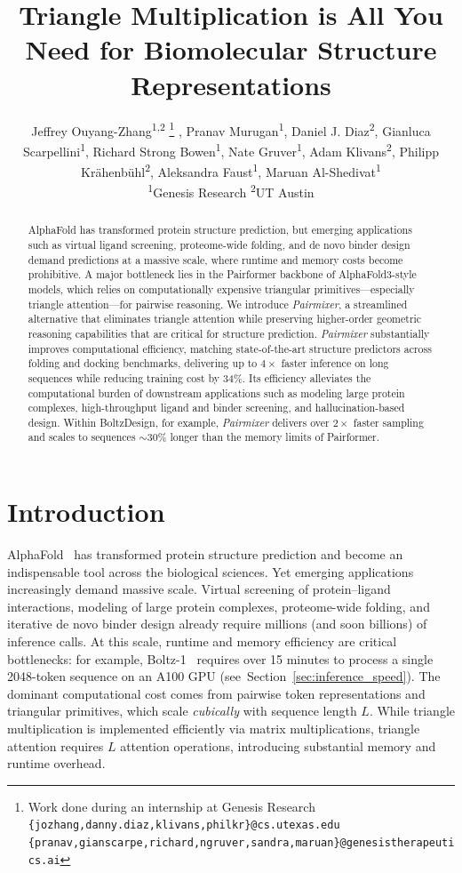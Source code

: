\documentclass{article} %
\title{Triangle Multiplication is All You Need for Biomolecular Structure Representations}
\author{
\hspace{-0.5em} Jeffrey Ouyang-Zhang\textsuperscript{1,2}
\thanks{Work done during an internship at Genesis Research \\ 
\texttt{\{jozhang,danny.diaz,klivans,philkr\}@cs.utexas.edu} \\
\texttt{\{pranav,gianscarpe,richard,ngruver,sandra,maruan\}@genesistherapeutics.ai}}
, Pranav Murugan\textsuperscript{1}, Daniel J. Diaz\textsuperscript{2}, Gianluca Scarpellini\textsuperscript{1},
\AND Richard Strong Bowen\textsuperscript{1}, Nate Gruver\textsuperscript{1},
Adam Klivans\textsuperscript{2}, Philipp Kr\"ahenb\"uhl\textsuperscript{2},
\AND Aleksandra Faust\textsuperscript{1}, Maruan Al-Shedivat\textsuperscript{1} \\
\textsuperscript{1}Genesis Research \quad \textsuperscript{2}UT Austin \\
}
\newcommand{\refsec}[1]{Section~\ref{sec:#1}}
\def\name{{\textit{Pairmixer}}\xspace}
\begin{document}
\maketitle

\begin{abstract}
AlphaFold has transformed protein structure prediction, but emerging applications such as virtual ligand screening, proteome-wide folding, and de novo binder design demand predictions at a massive scale, where runtime and memory costs become prohibitive.
A major bottleneck lies in the Pairformer backbone of AlphaFold3-style models, which relies on computationally expensive triangular primitives—especially triangle attention—for pairwise reasoning.
We introduce \name, a streamlined alternative that eliminates triangle attention while preserving higher-order geometric reasoning capabilities that are critical for structure prediction.
\name substantially improves computational efficiency, matching state-of-the-art structure predictors across folding and docking benchmarks, delivering up to $4\times$ faster inference on long sequences while reducing training cost by 34\%.
Its efficiency alleviates the computational burden of downstream applications such as modeling large protein complexes, high-throughput ligand and binder screening, and hallucination-based design.
Within BoltzDesign, for example, \name delivers over $2\times$ faster sampling and scales to sequences $\sim$30\% longer than the memory limits of Pairformer. 








\end{abstract}

\section{Introduction}

AlphaFold~\citep{senior2020improved,jumper2021alphafold2} has transformed protein structure prediction and become an indispensable tool across the biological sciences. Yet emerging applications increasingly demand massive scale. Virtual screening of protein–ligand interactions, modeling of large protein complexes, proteome-wide folding, and iterative de novo binder design already require millions (and soon billions) of inference calls. At this scale, runtime and memory efficiency are critical bottlenecks: for example, Boltz-1~\citep{wohlwend2024boltz1} requires over 15 minutes to process a single 2048-token sequence on an A100 GPU (see~\refsec{inference_speed}).
The dominant computational cost comes from pairwise token representations and triangular primitives, which scale \emph{cubically} with sequence length $L$. 
While triangle multiplication is implemented efficiently via matrix multiplications, triangle attention requires $L$ attention operations, introducing substantial memory and runtime overhead.
\end{document}
